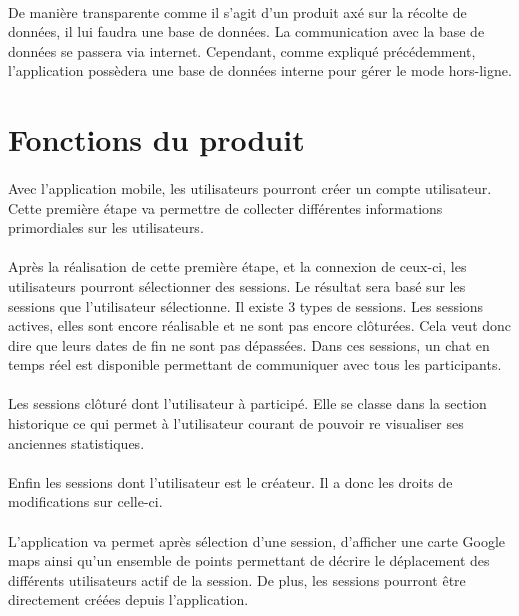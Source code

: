 \documentclass[titlepage, 12pt]{report}
\begin{document}
\paragraph{}De manière transparente comme il s'agit d'un produit axé sur la récolte de données, il lui faudra une base de données. La communication avec la base de données se passera via internet. Cependant, comme expliqué précédemment, l'application possèdera une base de données interne pour gérer le mode hors-ligne. 

\section{Fonctions du produit}

\paragraph{}Avec l'application mobile, les utilisateurs pourront créer un compte utilisateur. Cette première étape va permettre de collecter différentes informations primordiales sur les utilisateurs. 

\paragraph{}Après la réalisation de cette première étape, et la connexion de ceux-ci, les utilisateurs pourront sélectionner des sessions. Le résultat sera basé sur les sessions que l'utilisateur sélectionne. Il existe 3 types de sessions. Les sessions actives, elles sont encore réalisable et ne sont pas encore clôturées. Cela veut donc dire que leurs dates de fin ne sont pas dépassées. Dans ces sessions, un chat en temps réel est disponible permettant de communiquer avec tous les participants.
\paragraph{}Les sessions clôturé dont l'utilisateur à participé. Elle se classe dans la section historique ce qui permet à l'utilisateur courant de pouvoir re visualiser ses anciennes statistiques.
\paragraph{}Enfin les sessions dont l'utilisateur est le créateur. Il a donc les droits de modifications sur celle-ci.

\paragraph{}L'application va permet après sélection d'une session, d'afficher une carte Google maps ainsi qu'un ensemble de points permettant de décrire le déplacement des différents utilisateurs actif de la session.
De plus, les sessions pourront être directement créées depuis l'application.
\end{document}
